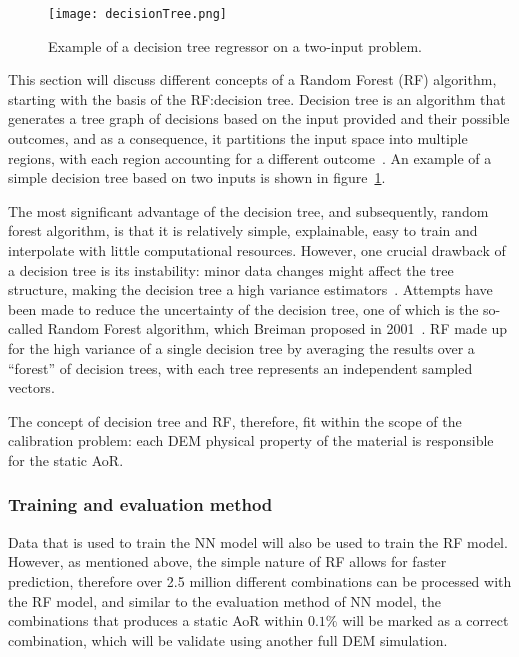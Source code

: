 \begin{figure}[H]
    \centering
    \texttt{[image: decisionTree.png]}
    \caption{Example of a decision tree regressor on a two-input problem.~\cite{murphyML}}\label{fig:decisionTree}
\end{figure}

This section will discuss different concepts of a Random Forest (RF) algorithm, starting with the basis of the RF:\@ decision tree. Decision tree is an algorithm that generates a tree graph of decisions based on the input provided and their possible outcomes, and as a consequence, it partitions the input space into multiple regions, with each region accounting for a different outcome~\cite{murphyML}. An example of a simple decision tree based on two inputs is shown in figure~\ref{fig:decisionTree}. 

The most significant advantage of the decision tree, and subsequently, random forest algorithm, is that it is relatively simple, explainable, easy to train and interpolate with little computational resources. However, one crucial drawback of a decision tree is its instability: minor data changes might affect the tree structure, making the decision tree a high variance estimators~\cite{murphyML}. Attempts have been made to reduce the uncertainty of the decision tree, one of which is the so-called Random Forest algorithm, which Breiman proposed in 2001~\cite{BreimanRF}. RF made up for the high variance of a single decision tree by averaging the results over a ``forest'' of decision trees, with each tree represents an independent sampled vectors. 

The concept of decision tree and RF, therefore, fit within the scope of the calibration problem: each DEM physical property of the material is responsible for the static AoR.

\subsubsection{Training and evaluation method}

Data that is used to train the NN model will also be used to train the RF model. However, as mentioned above, the simple nature of RF allows for faster prediction, therefore over 2.5 million different combinations can be processed with the RF model, and similar to the evaluation method of NN model, the combinations that produces a static AoR within $0.1\%$ will be marked as a correct combination, which will be validate using another full DEM simulation. 
